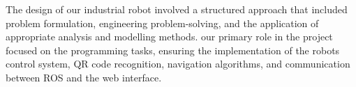 \documentclass[a4paper,12pt]{extreport}
\begin{document}









%  

The design of our industrial robot involved a structured approach that
included problem formulation, engineering problem-solving, and the
application of appropriate analysis and modelling methods. our primary
role in the project focused on the programming tasks, ensuring the
implementation of the robot\textquotesingle s control system, QR code
recognition, navigation algorithms, and communication between ROS and
the web interface.
\end{document}
